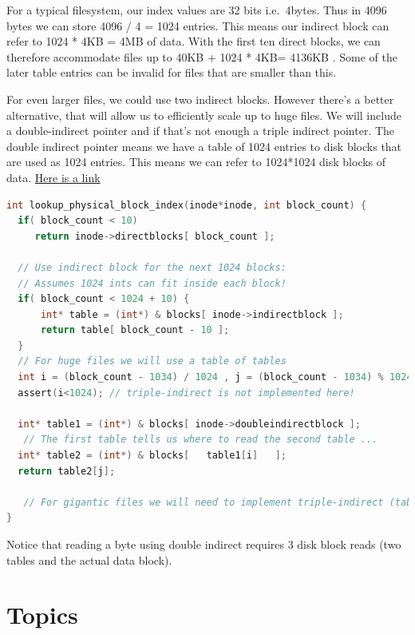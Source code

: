 For a typical filesystem, our index values are 32 bits i.e.~4bytes. Thus in 4096 bytes we can store 4096 / 4 = 1024 entries. This means our indirect block can refer to 1024 * 4KB = 4MB of data. With the first ten direct blocks, we can therefore accommodate files up to 40KB + 1024 * 4KB= 4136KB . Some of the later table entries can be invalid for files that are smaller than this.

For even larger files, we could use two indirect blocks. However there's a better alternative, that will allow us to efficiently scale up to huge files. We will include a double-indirect pointer and if that's not enough a triple indirect pointer. The double indirect pointer means we have a table of 1024 entries to disk blocks that are used as 1024 entries. This means we can refer to 1024*1024 disk blocks of data. \href{http://uw714doc.sco.com/en/FS\_admin/graphics/s5chain.gif}{Here is a link}

\begin{lstlisting}[language=C]
int lookup_physical_block_index(inode*inode, int block_count) {
  if( block_count < 10)
     return inode->directblocks[ block_count ];

  // Use indirect block for the next 1024 blocks:
  // Assumes 1024 ints can fit inside each block!
  if( block_count < 1024 + 10) {
      int* table = (int*) & blocks[ inode->indirectblock ];
      return table[ block_count - 10 ];
  }
  // For huge files we will use a table of tables
  int i = (block_count - 1034) / 1024 , j = (block_count - 1034) % 1024;
  assert(i<1024); // triple-indirect is not implemented here!

  int* table1 = (int*) & blocks[ inode->doubleindirectblock ];
   // The first table tells us where to read the second table ...
  int* table2 = (int*) & blocks[   table1[i]   ];
  return table2[j];

   // For gigantic files we will need to implement triple-indirect (table of tables of tables)
}
\end{lstlisting}

Notice that reading a byte using double indirect requires 3 disk block reads (two tables and the actual data block).

\section{Topics}\label{topics}

